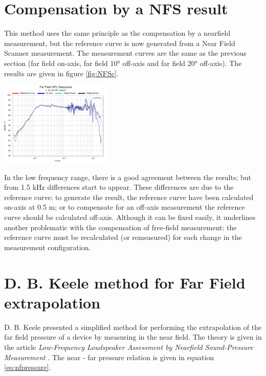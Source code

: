 \documentclass{report}
\begin{document}
\section{Compensation by a NFS result}

This method uses the same principle as the compensation by a nearfield measurement, but the reference curve is now generated from a Near Field Scanner measurement. The measurement curves are the same as the previous section (far field on-axis, far field 10° off-axis and far field 20° off-axis). The results are given in figure \ref{fig:NFSc}.\\

\begin{center}
	\includegraphics[width=0.4\textwidth]{RoomComp/NFS_compa} 
    \captionsetup{hypcap=false} 
	\label{fig:NFSc}
\end{center}

In the low frequency range, there is a good agreement between the results; but from 1.5 kHz differences start to appear. These differences are due to the reference curve: to generate the result, the reference curve have been calculated on-axis at 0.5 m; or to compensate for an off-axis measurement the reference curve should be calculated off-axis. Although it can be fixed easily, it underlines another problematic with the compensation of free-field measurement: the reference curve must be recalculated (or remeasured) for each change in the measurement configuration.

\section{D. B. Keele method for Far Field extrapolation}
\label{sec:dBKeele}

D. B. Keele presented a simplified method for performing the extrapolation of the far field pressure of a device by measuring in the near field. The theory is given in the article \textit{Low-Frequency Loudspeaker Assessment by Nearfield Sound-Pressure Measurement} \citep[see][]{dkeele}. The near - far pressure relation is given in equation \ref{eq:nfpressure}.
\end{document}
